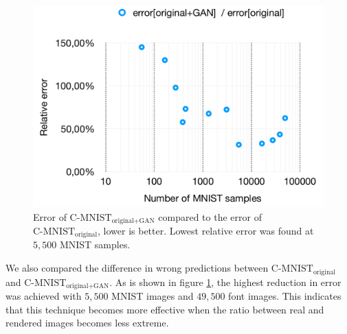 \documentclass[10pt,twocolumn,letterpaper]{article}
\begin{document}
\begin{figure}[h]
\begin{center}
	\includegraphics[width=0.9\linewidth]{../graph-error-comparison.png}
\end{center}
   \caption{Error of $\text{C-MNIST}_\text{original+GAN}$ compared to the error of $\text{C-MNIST}_\text{original}$, lower is better. Lowest relative error was found at $5,500$ MNIST samples.}
\label{fig:graph-relative-error}
\end{figure}

We also compared the difference in wrong predictions between $\text{C-MNIST}_\text{original}$ and $\text{C-MNIST}_\text{original+GAN}$. As is shown in figure \ref{fig:graph-relative-error}, the highest reduction in error was achieved with $5,500$ MNIST images and $49,500$ font images. This indicates that this technique becomes more effective when the ratio between real and rendered images becomes less extreme.
\end{document}
